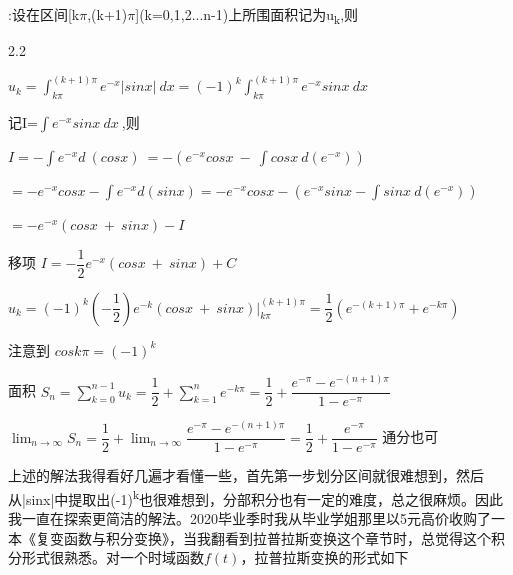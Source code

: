 \documentclass[12pt]{report}
\begin{document}
  :设在区间[k$\pi$,(k+1)$\pi$](k=0,1,2...n-1)上所围面积记为u\textsubscript{k},则 
  \begin{spacing}{2.2}
  	\begin{center}
  		$u_{k}=\int_{k\pi}^{\left(k+1\right)\pi}e^{-x}\left|sinx\right|\:dx=\left(-1\right)^{k}\int_{k\pi}^{\left(k+1\right)\pi}e^{-x}sinx\:dx\:$
  		
  		记I=$\int e^{-x}sinx\:dx\:$,则
  		
  		\hspace{-2em} $I=-\int e^{-x}d\:\left(cosx\right)\:=-\left(e^{-x}cosx\:-\:\int cosx\:d\left(e^{-x}\right)\right)$
  		
  		\hspace{5.7em} $=-e^{-x}cosx-\int e^{-x}d\left(sinx\right)=-e^{-x}cosx-\left(e^{-x}sinx-\int sinx\:d\left(e^{-x}\right)\right)$
  		
  		\hspace{-5cm} $=-e^{-x}\left(cosx\:+\:sinx\right)-I$ 
  		
  		移项 \hspace{1em} $I=-\dfrac{1}{2}e^{-x}\left(cosx\:+\:sinx\right)+C$
  		
  		$u_{k}=\left(-1\right)^{k}\left(-\dfrac{1}{2}\right)e^{-k}\left(cosx\:+\:sinx\right)\left|\right._{k\pi}^{\left(k+1\right)\pi}=\dfrac{1}{2}\left(e^{-\left(k+1\right)\pi}+e^{-k\pi}\right)$
  		
  		注意到 \hspace{2em}$cosk\pi=\left(-1\right)^{k}$ 
  		
  		面积 \hspace{2em} $S_{n}=\sum_{k=0}^{n-1}u_{k}=\dfrac{1}{2}+\sum_{k=1}^{n}e^{-k\pi}=\dfrac{1}{2}+\dfrac{e^{-\pi}-e^{-\left(n+1\right)\pi}}{1-e^{-\pi}}$
  		
  		\hspace{2em} $\lim_{n\rightarrow\infty}S_{n}=\dfrac{1}{2}+\lim_{n\rightarrow\infty}\dfrac{e^{-\pi}-e^{-\left(n+1\right)\pi}}{1-e^{-\pi}}=\dfrac{1}{2}+\dfrac{e^{-\pi}}{1-e^{-\pi}}$ \hspace{1em} 通分也可
  	\end{center}
  \end{spacing}
  
  上述的解法我得看好几遍才看懂一些，首先第一步划分区间就很难想到，然后从|sinx|中提取出(-1)\textsuperscript{k}也很难想到，分部积分也有一定的难度，总之很麻烦。因此我一直在探索更简洁的解法。2020毕业季时我从毕业学姐那里以5元高价收购了一本《复变函数与积分变换》，当我翻看到拉普拉斯变换这个章节时，总觉得这个积分形式很熟悉。对一个时域函数$f(t)$，拉普拉斯变换的形式如下
  
\end{document}
